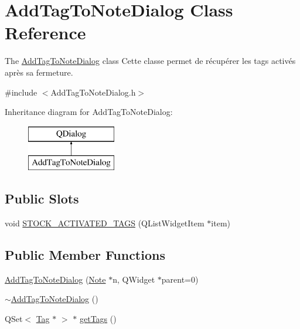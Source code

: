 \hypertarget{class_add_tag_to_note_dialog}{\section{Add\-Tag\-To\-Note\-Dialog Class Reference}
\label{class_add_tag_to_note_dialog}
}


The \hyperlink{class_add_tag_to_note_dialog}{Add\-Tag\-To\-Note\-Dialog} class Cette classe permet de récupérer les tags activés après sa fermeture.  




{\ttfamily \#include $<$Add\-Tag\-To\-Note\-Dialog.\-h$>$}

Inheritance diagram for Add\-Tag\-To\-Note\-Dialog\-:\begin{figure}[H]
\begin{center}
\leavevmode
\includegraphics[height=2.000000cm]{class_add_tag_to_note_dialog}
\end{center}
\end{figure}
\subsection*{Public Slots}
\begin{DoxyCompactItemize}
\item 
void \hyperlink{class_add_tag_to_note_dialog_aaddc8018838b394fb71a684ffe860f48}{S\-T\-O\-C\-K\-\_\-\-A\-C\-T\-I\-V\-A\-T\-E\-D\-\_\-\-T\-A\-G\-S} (Q\-List\-Widget\-Item $\ast$item)
\end{DoxyCompactItemize}
\subsection*{Public Member Functions}
\begin{DoxyCompactItemize}
\item 
\hyperlink{class_add_tag_to_note_dialog_a1c0f6522c0701b48cc7326f0e104caef}{Add\-Tag\-To\-Note\-Dialog} (\hyperlink{class_note}{Note} $\ast$n, Q\-Widget $\ast$parent=0)
\item 
\hyperlink{class_add_tag_to_note_dialog_ac1ffa2e0b3516c894a42bedbd19f900d}{$\sim$\-Add\-Tag\-To\-Note\-Dialog} ()
\item 
Q\-Set$<$ \hyperlink{class_tag}{Tag} $\ast$ $>$ $\ast$ \hyperlink{class_add_tag_to_note_dialog_a3769ca2890a3dce6578139bc6356d9c2}{get\-Tags} ()
\end{DoxyCompactItemize}


